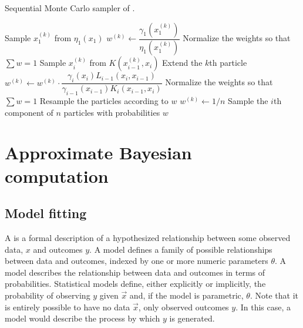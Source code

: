 \begin{algorithm}
  \caption{Sequential Monte Carlo sampler of \textcite{del2006sequential}.}
  \begin{algorithmic}
      \State Sample $x_1^{(k)}$ from $\eta_1(x_1)$
      \State $w^{(k)} \gets \dfrac{\gamma_1\left(x_1^{(k)}\right)}{\eta_1\left(x_1^{(k)}\right)}$
      \State Normalize the weights so that $\sum w = 1$
    \EndFor
        \State Sample $x_i^{(k)}$ from $K(x_{i-1}^{(k)}, x_i)$
        \Comment Extend the $k$th particle
        \State $w^{(k)} \gets w^{(k)} \cdot \dfrac{\gamma_i(x_i) L_{i-1}(x_i, x_{i-1})}{\gamma_{i-1}(x_{i-1}) K_i(x_{i-1}, x_i)}$
      \EndFor
      \State Normalize the weights so that $\sum w = 1$
        \State Resample the particles according to $w$
          \State $w^{(k)} \gets 1/n$
        \EndFor
      \EndIf
      \State Sample the $i$th component of $n$ particles with probabilities $w$
    \EndFor
  \end{algorithmic}
  \label{alg:smcsamp}
\end{algorithm}

\section{Approximate Bayesian computation}
\label{sec:abc}


\subsection{Model fitting}
\label{subsec:mfit}

A  is a formal description of a hypothesized
relationship between some observed data, $x$ and outcomes $y$. A
 model defines a family of possible relationships between data
and outcomes, indexed by one or more numeric parameters $\theta$. A
 model describes the relationship between data and outcomes
in terms of probabilities. Statistical models define, either explicitly or
implicitly, the probability of observing $y$ given $\vec{x}$ and, if the
model is parametric, $\theta$. Note that it is entirely possible to have no
data $\vec{x}$, only observed outcomes $y$. In this case, a model would
describe the process by which $y$ is generated.

